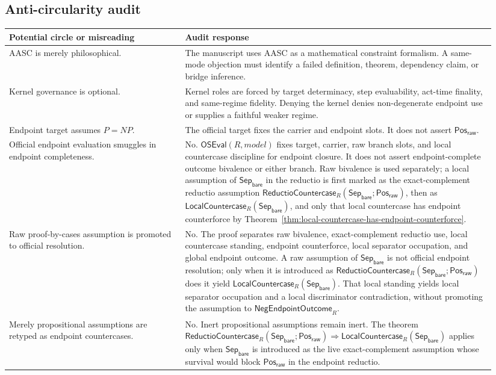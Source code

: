 \documentclass[11pt]{article}
\theoremstyle{definition}
\theoremstyle{remark}
\newcommand{\PosRaw}{\mathsf{Pos}_{\mathsf{raw}}}
\newcommand{\SepBare}{\mathsf{Sep}_{\mathsf{bare}}}
\newcommand{\OfficialSATEval}{\mathsf{OSEval}}
\newcommand{\NegEndpointOutcome}{\mathsf{NegEndpointOutcome}}
\newcommand{\LocalCountercase}{\mathsf{LocalCountercase}}
\newcommand{\ReductioCountercase}{\mathsf{ReductioCountercase}}
\begin{document}
\subsection*{Anti-circularity audit}
{\small
\begin{longtable}{>{\raggedright\arraybackslash}p{0.34\linewidth}>{\raggedright\arraybackslash}p{0.60\linewidth}}
\toprule
Potential circle or misreading & Audit response \\
\midrule
AASC is merely philosophical. & The manuscript uses AASC as a mathematical constraint formalism. A same-mode objection must identify a failed definition, theorem, dependency claim, or bridge inference. \\
Kernel governance is optional. & Kernel roles are forced by target determinacy, step evaluability, act-time finality, and same-regime fidelity. Denying the kernel denies non-degenerate endpoint use or supplies a faithful weaker regime. \\
Endpoint target assumes \(P=NP\). & The official target fixes the carrier and endpoint slots. It does not assert \(\PosRaw\). \\
Official endpoint evaluation smuggles in endpoint completeness. & No. \(\OfficialSATEval(R,model)\) fixes target, carrier, raw branch slots, and local countercase discipline for endpoint closure. It does not assert endpoint-complete outcome bivalence or either branch. Raw bivalence is used separately; a local assumption of \(\SepBare\) in the reductio is first marked as the exact-complement reductio assumption \(\ReductioCountercase_R(\SepBare;\PosRaw)\), then as \(\LocalCountercase_R(\SepBare)\), and only that local countercase has endpoint counterforce by Theorem~\ref{thm:local-countercase-has-endpoint-counterforce}. \\
Raw proof-by-cases assumption is promoted to official resolution. & No. The proof separates raw bivalence, exact-complement reductio use, local countercase standing, endpoint counterforce, local separator occupation, and global endpoint outcome. A raw assumption of \(\SepBare\) is not official endpoint resolution; only when it is introduced as \(\ReductioCountercase_R(\SepBare;\PosRaw)\) does it yield \(\LocalCountercase_R(\SepBare)\). That local standing yields local separator occupation and a local discriminator contradiction, without promoting the assumption to \(\NegEndpointOutcome_R\). \\
Merely propositional assumptions are retyped as endpoint countercases. & No. Inert propositional assumptions remain inert. The theorem \(\ReductioCountercase_R(\SepBare;\PosRaw)\Rightarrow\LocalCountercase_R(\SepBare)\) applies only when \(\SepBare\) is introduced as the live exact-complement assumption whose survival would block \(\PosRaw\) in the endpoint reductio. \\

\end{longtable}}
\end{document}
